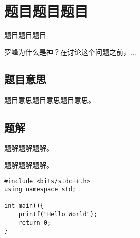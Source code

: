 \def\sectionName{题目题目题目}
\section{\sectionName}



\begin{frame}

\isBeamerMode\relax
    {\Huge \sectionName}\par
\fi




罗峰为什么是神？在讨论这个问题之前，...


\end{frame}

\subsection{题目意思}
\begin{frame} %
题目意思题目意思题目意思。
\end{frame}



\subsection{题解}
\begin{frame}
题解题解题解。
\end{frame}


\begin{frame}[fragile] %
题解题解题解。

\begin{lstlisting}[style=C++]
#include <bits/stdc++.h>
using namespace std;

int main(){
    printf("Hello World");
    return 0;
}
\end{lstlisting}
\end{frame}
